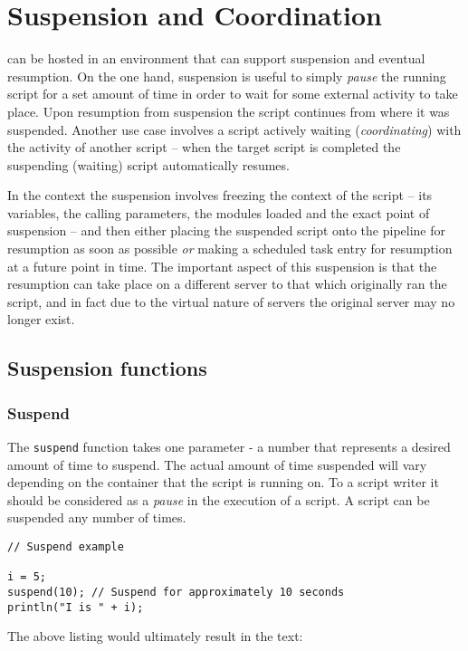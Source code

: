 \chapter{Suspension and Coordination}
\Reflex can be hosted in an environment that can support suspension and eventual resumption. On the one hand, suspension is useful to simply \emph{pause} the running script for a set amount of time in order to wait for some external activity to take place. Upon resumption from suspension the script continues from where it was suspended. Another use case involves a script actively waiting (\emph{coordinating}) with the activity of another script -- when the target script is completed the suspending (waiting) script automatically resumes.


In the \Rapture context the suspension involves freezing the context of the script -- its variables, the calling parameters, the modules loaded and the exact point of suspension -- and then either placing the suspended script onto the \Rapture pipeline for resumption as soon as possible \emph{or} making a scheduled task entry for resumption at a future point in time. The important aspect of this suspension is that the resumption can take place on a different \Rapture server to that which originally ran the script, and in fact due to the virtual nature of \Rapture servers the original server may no longer exist.

\section{Suspension functions}
\subsection{Suspend}
The \verb+suspend+ function takes one parameter - a number that represents a desired amount of time to suspend. The actual amount of time suspended will vary depending on the container that the script is running on. To a script writer it should be considered as a \emph{pause} in the execution of a script. A script can be suspended any number of times.

\begin{lstlisting}[caption={Reflex Page Script Example}]
// Suspend example

i = 5;
suspend(10); // Suspend for approximately 10 seconds
println("I is " + i);

\end{lstlisting}

The above listing would ultimately result in the text:

